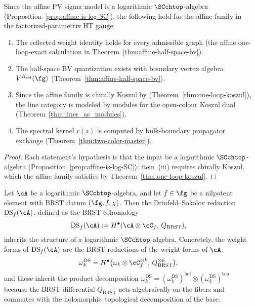 \begin{corollary}%
\label{cor:affine-half-space-consequences}
Since the affine PV sigma model is a logarithmic $\SCchtop$-algebra
\textup{(}Proposition~\textup{\ref{prop:affine-is-log-SC})},
the following hold for the affine family in the
factorized-parametrix HT gauge:
\begin{enumerate}[label=\textup{(\roman*)}]
\item The reflected weight identity holds for every admissible graph
\textup{(}the affine one-loop-exact calculation in
Theorem~\textup{\ref{thm:affine-half-space-bv})}.
\item The half-space BV quantization exists with boundary vertex
algebra $V^{K_{\mathrm{eff}}}(\fg)$
\textup{(}Theorem~\textup{\ref{thm:affine-half-space-bv})}.
\item Since the affine family is chirally Koszul by
\textup{(}Theorem~\textup{\ref{thm:one-loop-koszul}}\textup{)}, the
line category is modeled by modules for the open-colour
Koszul dual
\textup{(}Theorem~\textup{\ref{thm:lines_as_modules})}.
\item The spectral kernel $r(z)$ is computed by bulk-boundary
propagator exchange
\textup{(}Theorem~\textup{\ref{thm:two-color-master})}.
\end{enumerate}
\end{corollary}

\begin{proof}
Each statement's hypothesis is that the input be a logarithmic
$\SCchtop$-algebra (Proposition~\ref{prop:affine-is-log-SC});
item~(iii) requires chirally Koszul, which the affine
family satisfies by Theorem~\ref{thm:one-loop-koszul}.
\end{proof}

\begin{proposition}%
\label{prop:ds-preserves-SC}
Let $\cA$ be a logarithmic $\SCchtop$-algebra, and let
$f \in \fg$ be a nilpotent element with BRST datum
$(\fg, f, \chi)$. Then the Drinfeld--Sokolov reduction
$\mathrm{DS}_f(\cA)$, defined as the BRST cohomology
\[
\mathrm{DS}_f(\cA) := H^\bullet(\cA \otimes \cC_f,\, Q_{\mathrm{BRST}}),
\]
inherits the structure of a logarithmic $\SCchtop$-algebra.
Concretely, the weight forms of $\mathrm{DS}_f(\cA)$ are the BRST
reductions of the weight forms of $\cA$:
\[
\omega_k^{\mathrm{DS}} = H^\bullet\bigl(\omega_k \otimes \cC_f^{\otimes k},\,
Q_{\mathrm{BRST}}^{\otimes k}\bigr),
\]
and these inherit the product decomposition
$\omega_k^{\mathrm{DS}} = (\omega_k^{\mathrm{DS}})^{\mathrm{hol}} \otimes
(\omega_k^{\mathrm{DS}})^{\mathrm{top}}$
because the BRST differential $Q_{\mathrm{BRST}}$ acts
algebraically on the fibers and commutes with the
holomorphic--topological decomposition of the base.
\end{proposition}

